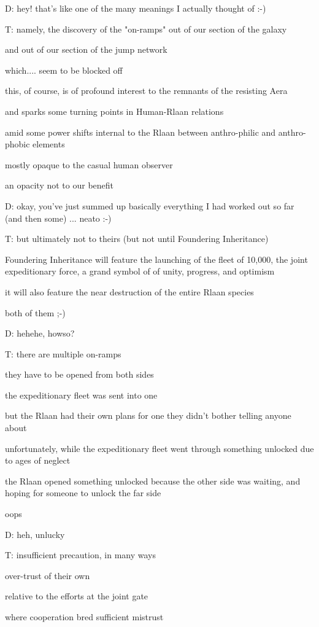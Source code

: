 {D: hey! that's like one of the many meanings I actually thought of :-)

T: namely, the discovery of the "on-ramps" out of our section of the galaxy

and out of our section of the jump network

which.... seem to be blocked off

this, of course, is of profound interest to the remnants of the resisting Aera

and sparks some turning points in Human-Rlaan relations

amid some power shifts internal to the Rlaan between anthro-philic and anthro-phobic elements

mostly opaque to the casual human observer

an opacity not to our benefit

D: okay, you've just summed up basically everything I had worked out so far (and then some) ... neato :-)

T: but ultimately not to theirs (but not until Foundering Inheritance)

Foundering Inheritance will feature the launching of the fleet of 10,000, the joint expeditionary force, a grand symbol of of unity, progress, and optimism 

it will also feature the near destruction of the entire Rlaan species

both of them ;-)

D: hehehe, howso?

T: there are multiple on-ramps

they have to be opened from both sides

the expeditionary fleet was sent into one

but the Rlaan had their own plans for one they didn't bother telling anyone about

unfortunately, while the expeditionary fleet went through something unlocked due to ages of neglect

the Rlaan opened something unlocked because the other side was waiting, and hoping for someone to unlock the far side

oops

D: heh, unlucky

T: insufficient precaution, in many ways

over-trust of their own

relative to the efforts at the joint gate

where cooperation bred sufficient mistrust

}
